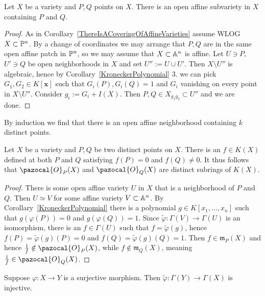     \begin{lemma}
        Let $X$ be a variety and $P,Q$ points on $X$. There is an open affine subvariety in $X$ containing $P$ and $Q$.
    \end{lemma}
    \begin{proof}
        As in Corollary~\ref{ThereIsACoveringOfAffineVarieties} assume WLOG $X\subset\mathbb{P}^n$. By a change of coordinates we may arrange that $P,Q$ are in the same open affine patch in $\mathbb{P}^n$, so we may assume that $X\subset \mathbb{A}^n$ is affine. Let $U\ni P$, $U'\ni Q$ be open neighborhoods in $X$ and set $U'':= U\cup U'$. Then $X\setminus U''$ is algebraic, hence by Corollary~\ref{KroneckerPolynomial} 3. we can pick $G_1,G_2\in K[\mathbf{x}]$ such that $G_i(P),G_i(Q)= 1$ and $G_i$ vanishing on every point in $X\setminus U''$. Consider $g_i := G_i + I(X)$. Then $P,Q\in X_{g_1g_2} \subset U''$ and we are done.   
    \end{proof}
    \begin{remark}
        By induction we find that there is an open affine neighborhood containing $k$ distinct points. 
    \end{remark}
    \begin{lemma}\label{WeCanConstructRationalFunctionVanishingAtOnePointAndNotAnoter}
        Let $X$ be a variety and $P,Q$ be two distinct points on $X$. There is an $f\in K(X)$ defined at both $P$ and $Q$ satisfying $f(P)=0$ and $f(Q)\neq 0$. It thus follows that $\pazocal{O}_P(X)$ and $\pazocal{O}_Q(X)$ are distinct subrings of $K(X)$.
    \end{lemma}
    \begin{proof}
        There is some open affine variety $U$ in $X$ that is a neighborhood of $P$ and $Q$. Then $U\simeq V$ for some affine variety $V\subset \mathbb{A}^n$. By Corollary~\ref{KroneckerPolynomial} there is a polynomial $g\in K[x_1,\dots,x_n]$ such that $g(\varphi(P))=0$ and $g(\varphi(Q))=1$. Since $\widetilde{\varphi}: \Gamma(V)\rightarrow \Gamma(U)$ is an isomorphism, there is an $f\in \Gamma(U)$ such that $f=\widetilde{\varphi}(g)$, hence $f(P)=\widetilde{\varphi}(g)(P)=0$ and $f(Q)=\widetilde{\varphi}(g)(Q)=1$. Then $f\in \mathfrak{m}_P(X)$ and hence $\frac{1}{f}\notin \pazocal{O}_P(X)$, while $f\notin \mathfrak{m}_Q(X)$, meaning $\frac{1}{f}\in \pazocal{O}_Q(X)$. 
    \end{proof}
    \begin{lemma}
        Suppose $\varphi: X\rightarrow Y$ is a surjective morphism. Then $\widetilde{\varphi}: \Gamma(Y)\rightarrow \Gamma(X)$ is injective. 
    \end{lemma}
